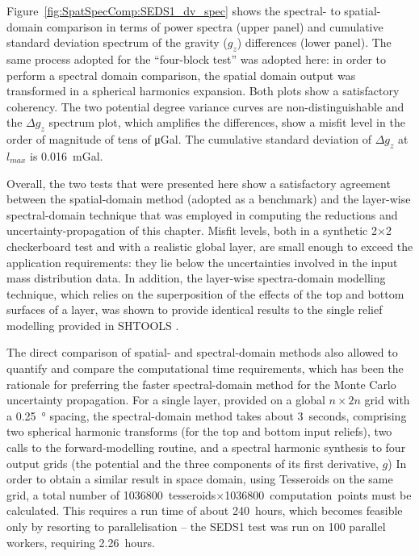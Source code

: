 \begin{subappendices}
Figure~\ref{fig:SpatSpecComp:SEDS1_dv_spec} shows the spectral- to spatial-domain comparison in terms of power spectra (upper panel) and cumulative standard deviation spectrum of the gravity ($g_z$) differences (lower panel).
The same process adopted for the ``four-block test'' was adopted here: in order to perform a spectral domain comparison, the spatial domain output was transformed in a spherical harmonics expansion.
Both plots show a satisfactory coherency.
The two potential degree variance curves are non-distinguishable and the $\Delta g_z$ spectrum plot, which amplifies the differences, show a misfit level in the order of magnitude of tens of \si{\micro Gal}.
The cumulative standard deviation of  $\Delta g_z$ at $l_{max}$ is \SI{0.016}{\milli Gal}.


Overall, the two tests that were presented here show a satisfactory agreement between the spatial-domain method (adopted as a benchmark) and the layer-wise spectral-domain technique that was employed in computing the reductions and uncertainty-propagation of this chapter.
Misfit levels, both in a synthetic 2$\times$2 checkerboard test and with a realistic global layer, are small enough to exceed the application requirements: they lie below the uncertainties involved in the input mass distribution data.
In addition, the layer-wise spectra-domain modelling technique, which relies on the superposition of the effects of the top and bottom surfaces of a layer, was shown to provide identical results to the single relief modelling provided in SHTOOLS \parencite{Wieczorek2018}.

The direct comparison of spatial- and spectral-domain methods also allowed to quantify and compare the computational time requirements, which has been the rationale for preferring the faster spectral-domain method for the Monte Carlo uncertainty propagation.
For a single layer, provided on a global $n \times 2n$ grid with a \SI{0.25}{\degree} spacing, the spectral-domain method takes about 3~seconds, comprising two spherical harmonic transforms (for the top and bottom input reliefs), two calls to the forward-modelling routine, and a spectral harmonic synthesis to four output grids (the potential and the three components of its first derivative, $g$)
In order to obtain a similar result in space domain, using Tesseroids \parencite{UiedaTesseroids} on the same grid, a total number of \SI{1036800}{tesseroids}$\times$\SI{1036800}{computation points} must be calculated.
This requires a run time of about \SI{240}{hours}, which becomes feasible only by resorting to parallelisation -- the SEDS1 test was run on \num{100} parallel workers, requiring \SI{2.26}{hours}.


\end{subappendices}

